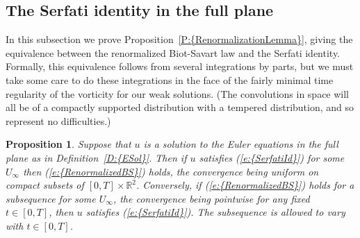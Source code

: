 \documentclass[reqno,openright,11pt,twoside]{amsart}
\newtheorem{prop}[theorem]{Proposition}
\theoremstyle{definition}
\numberwithin{equation}{section}
\begin{document}
\subsection{The Serfati identity in the full plane}\label{S:SerfatiIdR2}

\noindent In this subsection we prove {Proposition~\ref{P:{RenormalizationLemma}}}, giving the equivalence between the renormalized Biot-Savart law and the Serfati identity. Formally, this equivalence follows from several integrations  by parts, but we must take some care to do these integrations in the face of the fairly minimal time regularity of the vorticity for our weak solutions. (The convolutions in space will all be of a compactly supported distribution with a tempered distribution, and so represent no difficulties.)

\begin{prop}\label{P:RenormalizationLemma}
	Suppose that $u$ is a solution to the Euler equations in the full plane
	as in {Definition~\ref{D:{ESol}}}.  Then if $u$ satisfies
	{(\ref{e:{SerfatiId}})} for some $U_{\ensuremath{\infty}}$
	then {(\ref{e:{RenormalizedBS}})} holds, the convergence being uniform on compact subsets
	of $[0, T] \times {\ensuremath{{\ensuremath{\mathbb{{R}}}}}}^2$.
	Conversely, if {(\ref{e:{RenormalizedBS}})} holds for a subsequence
	for some $U_{\ensuremath{\infty}}$,
	the convergence being pointwise for any fixed $t \in [0, T]$,
	then $u$ satisfies
	{(\ref{e:{SerfatiId}})}.
	The subsequence is allowed to vary with $t \in [0, T]$.
\end{prop}
\end{document}
